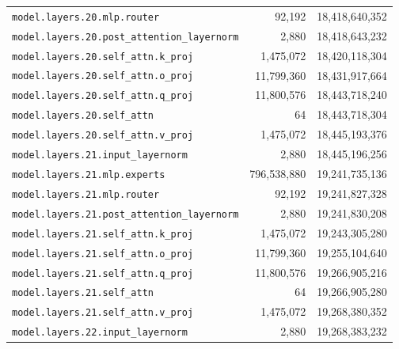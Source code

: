 \documentclass[10pt,a4paper]{article}
\theoremstyle{definition}
\begin{document}
\begin{appendices}
\begin{longtable}{p{9.5cm}rr}
\texttt{model.\allowbreak{}layers.\allowbreak{}20.\allowbreak{}mlp.\allowbreak{}router} & 92,192 & 18,418,640,352 \\
\texttt{model.\allowbreak{}layers.\allowbreak{}20.\allowbreak{}post\_attention\_layernorm} & 2,880 & 18,418,643,232 \\
\texttt{model.\allowbreak{}layers.\allowbreak{}20.\allowbreak{}self\_attn.\allowbreak{}k\_proj} & 1,475,072 & 18,420,118,304 \\
\texttt{model.\allowbreak{}layers.\allowbreak{}20.\allowbreak{}self\_attn.\allowbreak{}o\_proj} & 11,799,360 & 18,431,917,664 \\
\texttt{model.\allowbreak{}layers.\allowbreak{}20.\allowbreak{}self\_attn.\allowbreak{}q\_proj} & 11,800,576 & 18,443,718,240 \\
\texttt{model.\allowbreak{}layers.\allowbreak{}20.\allowbreak{}self\_attn} & 64 & 18,443,718,304 \\
\texttt{model.\allowbreak{}layers.\allowbreak{}20.\allowbreak{}self\_attn.\allowbreak{}v\_proj} & 1,475,072 & 18,445,193,376 \\
\texttt{model.\allowbreak{}layers.\allowbreak{}21.\allowbreak{}input\_layernorm} & 2,880 & 18,445,196,256 \\
\texttt{model.\allowbreak{}layers.\allowbreak{}21.\allowbreak{}mlp.\allowbreak{}experts} & 796,538,880 & 19,241,735,136 \\
\texttt{model.\allowbreak{}layers.\allowbreak{}21.\allowbreak{}mlp.\allowbreak{}router} & 92,192 & 19,241,827,328 \\
\texttt{model.\allowbreak{}layers.\allowbreak{}21.\allowbreak{}post\_attention\_layernorm} & 2,880 & 19,241,830,208 \\
\texttt{model.\allowbreak{}layers.\allowbreak{}21.\allowbreak{}self\_attn.\allowbreak{}k\_proj} & 1,475,072 & 19,243,305,280 \\
\texttt{model.\allowbreak{}layers.\allowbreak{}21.\allowbreak{}self\_attn.\allowbreak{}o\_proj} & 11,799,360 & 19,255,104,640 \\
\texttt{model.\allowbreak{}layers.\allowbreak{}21.\allowbreak{}self\_attn.\allowbreak{}q\_proj} & 11,800,576 & 19,266,905,216 \\
\texttt{model.\allowbreak{}layers.\allowbreak{}21.\allowbreak{}self\_attn} & 64 & 19,266,905,280 \\
\texttt{model.\allowbreak{}layers.\allowbreak{}21.\allowbreak{}self\_attn.\allowbreak{}v\_proj} & 1,475,072 & 19,268,380,352 \\
\texttt{model.\allowbreak{}layers.\allowbreak{}22.\allowbreak{}input\_layernorm} & 2,880 & 19,268,383,232 \\

\end{longtable}
\end{appendices}
\end{document}
